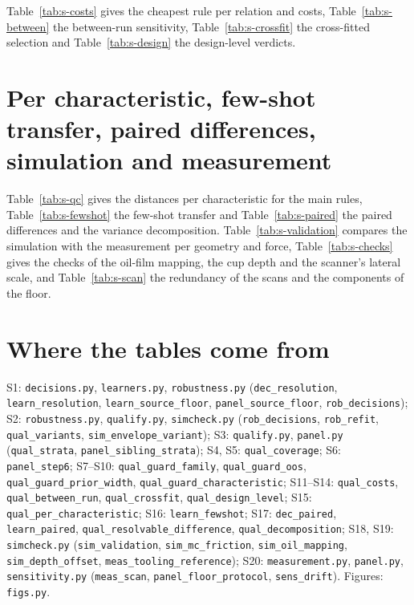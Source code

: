 \documentclass[pdflatex,sn-basic]{sn-jnl}
\begin{document}
Table~\ref{tab:s-costs} gives the cheapest rule per relation and costs, Table~\ref{tab:s-between} the between-run sensitivity, Table~\ref{tab:s-crossfit} the cross-fitted selection and Table~\ref{tab:s-design} the design-level verdicts.

\section{Per characteristic, few-shot transfer, paired differences, simulation and measurement}

Table~\ref{tab:s-qc} gives the distances per characteristic for the main rules, Table~\ref{tab:s-fewshot} the few-shot transfer and Table~\ref{tab:s-paired} the paired differences and the variance decomposition. Table~\ref{tab:s-validation} compares the simulation with the measurement per geometry and force, Table~\ref{tab:s-checks} gives the checks of the oil-film mapping, the cup depth and the scanner's lateral scale, and Table~\ref{tab:s-scan} the redundancy of the scans and the components of the floor.

\section{Where the tables come from}

S1: \texttt{decisions.py}, \texttt{learners.py}, \texttt{robustness.py} (\texttt{dec\_resolution}, \texttt{learn\_resolution}, \texttt{learn\_source\_floor}, \texttt{panel\_source\_floor}, \texttt{rob\_decisions}); S2: \texttt{robustness.py}, \texttt{qualify.py}, \texttt{simcheck.py} (\texttt{rob\_decisions}, \texttt{rob\_refit}, \texttt{qual\_variants}, \texttt{sim\_envelope\_variant}); S3: \texttt{qualify.py}, \texttt{panel.py} (\texttt{qual\_strata}, \texttt{panel\_sibling\_strata}); S4, S5: \texttt{qual\_coverage}; S6: \texttt{panel\_step6}; S7--S10: \texttt{qual\_guard\_family}, \texttt{qual\_guard\_oos}, \texttt{qual\_guard\_prior\_width}, \texttt{qual\_guard\_characteristic}; S11--S14: \texttt{qual\_costs}, \texttt{qual\_between\_run}, \texttt{qual\_crossfit}, \texttt{qual\_design\_level}; S15: \texttt{qual\_per\_characteristic}; S16: \texttt{learn\_fewshot}; S17: \texttt{dec\_paired}, \texttt{learn\_paired}, \texttt{qual\_resolvable\_difference}, \texttt{qual\_decomposition}; S18, S19: \texttt{simcheck.py} (\texttt{sim\_validation}, \texttt{sim\_mc\_friction}, \texttt{sim\_oil\_mapping}, \texttt{sim\_depth\_offset}, \texttt{meas\_tooling\_reference}); S20: \texttt{measurement.py}, \texttt{panel.py}, \texttt{sensitivity.py} (\texttt{meas\_scan}, \texttt{panel\_floor\_protocol}, \texttt{sens\_drift}). Figures: \texttt{figs.py}.
\end{document}
